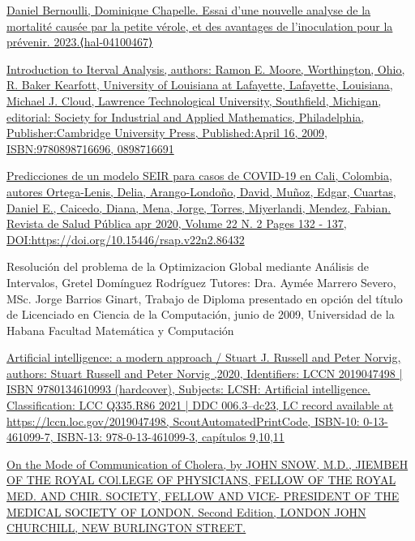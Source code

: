 \begin{itemize}
\begin{thebibliography}
    \bibitem[6]{}\href{https://inria.hal.science/hal-04100467}{Daniel Bernoulli, Dominique Chapelle. Essai d'une nouvelle analyse de la mortalité causée par la petite vérole, et des avantages de l'inoculation pour la prévenir. 2023.⟨hal-04100467⟩}
\label{sec:6}

    \bibitem[7] {}\href{ https://www.google.com/books/edition/Introduction_to_Interval_Analysis/kd8FmmN7sAoC?hl=en&gbpv=0 }{Introduction to Iterval Analysis, authors:
    Ramon E. Moore, Worthington, Ohio, R. Baker Kearfott, University of Louisiana at Lafayette, Lafayette, Louisiana, Michael J. Cloud, Lawrence Technological University, Southfield, Michigan, editorial: Society for Industrial and Applied Mathematics, Philadelphia,  Publisher:Cambridge University Press, Published:April 16, 2009, ISBN:9780898716696, 0898716691}

     \label{sec:7}

    \bibitem[8] {}\href{https://www.scielosp.org/pdf/rsap/2020.v22n2/132-137/es}{Predicciones de un modelo SEIR para casos de COVID-19 en Cali, Colombia, autores Ortega-Lenis, Delia, Arango-Londoño, David, Muñoz, Edgar, Cuartas, Daniel E., Caicedo, Diana, Mena, Jorge, Torres, Miyerlandi, Mendez, Fabian.  Revista de Salud Pública apr 2020, Volume 22 N. 2 Pages 132 - 137,  DOI:https://doi.org/10.15446/rsap.v22n2.86432  }
     \label{sec:8}

    \bibitem [9]{}Resolución del problema de la Optimizacion Global mediante Análisis de Intervalos, Gretel Domínguez Rodríguez Tutores: Dra. Aymée Marrero Severo, MSc. Jorge Barrios Ginart, Trabajo de Diploma presentado en opción del título de Licenciado en Ciencia de la Computación, junio de 2009, Universidad de la Habana Facultad Matemática y Computación
     \label{sec:9}

    \bibitem [10]{ } \href{https://lccn.loc.gov/2019047498 }{Artificial intelligence: a modern approach / Stuart J. Russell and Peter Norvig, authors: Stuart Russell and Peter Norvig ,2020, Identifiers: LCCN 2019047498 | ISBN 9780134610993 (hardcover), Subjects: LCSH: Artificial intelligence. Classification: LCC Q335.R86 2021 | DDC 006.3–dc23, LC record available at https://lccn.loc.gov/2019047498, ScoutAutomatedPrintCode, ISBN-10: 0-13-461099-7, ISBN-13: 978-0-13-461099-3, capítulos 9,10,11}
     \label{sec:10}

    \bibitem[11]{} \href{https://ia601500.us.archive.org/19/items/b28985266/b28985266.pdf}{On the Mode of Communication of Cholera, by JOHN SNOW, M.D., JIEMBEH OF THE ROYAL COl.LEGE OF PHYSICIANS, FELLOW OF THE ROYAL MED. AND CHIR. SOCIETY, FELLOW AND VICE- PRESIDENT OF THE MEDICAL SOCIETY OF LONDON. Second Edition, LONDON JOHN CHURCHILL, NEW BURLINGTON STREET. }
     \label{sec:11}


\end{thebibliography}
\end{itemize}
